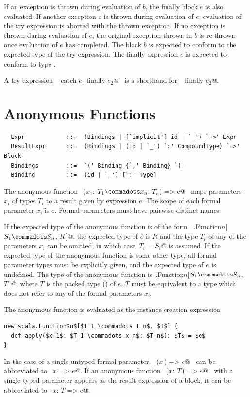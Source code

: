 If an exception is thrown during evaluation of $b$, the finally block
$e$ is also evaluated. If another exception $e$ is thrown
during evaluation of $e$, evaluation of the try expression is
aborted with the thrown exception. If no exception is thrown during
evaluation of $e$, the original exception thrown in $b$ is
re-thrown once evaluation of $e$ has completed.  The block
$b$ is expected to conform to the expected type of the try
expression. The finally expression $e$ is expected to conform to
type .

A try expression ~ catch $e_1$ finally $e_2$@~ 
is a shorthand
for  ~ finally $e_2$@.

\section{Anonymous Functions}
\label{sec:closures}

\syntax\begin{lstlisting}
  Expr            ::=  (Bindings | [`implicit'] id | `_') `=>' Expr
  ResultExpr      ::=  (Bindings | (id | `_') `:' CompoundType) `=>' Block
  Bindings        ::=  `(' Binding {`,' Binding} `)'
  Binding         ::=  (id | `_') [`:' Type]
\end{lstlisting}

The anonymous function ~\lstinline@($x_1$: $T_1 \commadots x_n$: $T_n$) => e@~ 
maps parameters $x_i$ of types $T_i$ to a result given
by expression $e$. The scope of each formal parameter
$x_i$ is $e$. Formal parameters must have pairwise distinct names.

If the expected type of the anonymous function is of the form
~\lstinline@scala.Function$n$[$S_1 \commadots S_n$, $R\,$]@, the
expected type of $e$ is $R$ and the type $T_i$ of any of the
parameters $x_i$ can be omitted, in which
case~\lstinline@$T_i$ = $S_i$@ is assumed.
If the expected type of the anonymous function is
some other type, all formal parameter types must be explicitly given,
and the expected type of $e$ is undefined. The type of the anonymous
function
is~\lstinline@scala.Function$n$[$S_1 \commadots S_n$, $T\,$]@,
where $T$ is the packed type () 
of $e$. $T$ must be equivalent to a
type which does not refer to any of the formal parameters $x_i$.

The anonymous function is evaluated as the instance creation expression
\begin{lstlisting}
new scala.Function$n$[$T_1 \commadots T_n$, $T$] {
  def apply($x_1$: $T_1 \commadots x_n$: $T_n$): $T$ = $e$
}
\end{lstlisting}
In the case of a single untyped formal parameter, 
~\lstinline@($x\,$) => $e$@~ 
can be abbreviated to ~\lstinline@$x$ => $e$@. If an
anonymous function ~\lstinline@($x$: $T\,$) => $e$@~ with a single
typed parameter appears as the result expression of a block, it can be
abbreviated to ~\lstinline@$x$: $T$ => e@.

